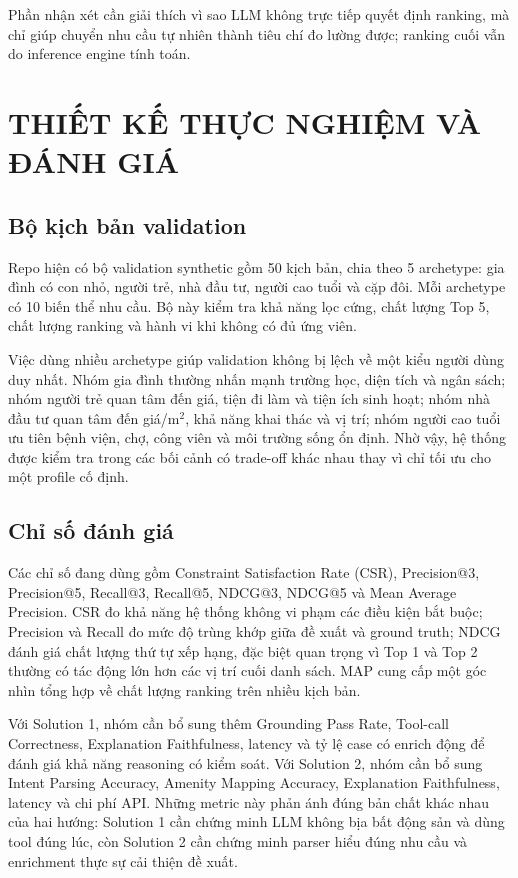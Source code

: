 \documentclass[a4paper,12pt]{article}
\begin{document}
Phần nhận xét cần giải thích vì sao LLM không trực tiếp quyết định ranking, mà chỉ giúp chuyển nhu cầu tự nhiên thành tiêu chí đo lường được; ranking cuối vẫn do inference engine tính toán.

\section{THIẾT KẾ THỰC NGHIỆM VÀ ĐÁNH GIÁ}

\subsection{Bộ kịch bản validation}
Repo hiện có bộ validation synthetic gồm 50 kịch bản, chia theo 5 archetype: gia đình có con nhỏ, người trẻ, nhà đầu tư, người cao tuổi và cặp đôi. Mỗi archetype có 10 biến thể nhu cầu. Bộ này kiểm tra khả năng lọc cứng, chất lượng Top 5, chất lượng ranking và hành vi khi không có đủ ứng viên.

Việc dùng nhiều archetype giúp validation không bị lệch về một kiểu người dùng duy nhất. Nhóm gia đình thường nhấn mạnh trường học, diện tích và ngân sách; nhóm người trẻ quan tâm đến giá, tiện đi làm và tiện ích sinh hoạt; nhóm nhà đầu tư quan tâm đến giá/m$^2$, khả năng khai thác và vị trí; nhóm người cao tuổi ưu tiên bệnh viện, chợ, công viên và môi trường sống ổn định. Nhờ vậy, hệ thống được kiểm tra trong các bối cảnh có trade-off khác nhau thay vì chỉ tối ưu cho một profile cố định.

\subsection{Chỉ số đánh giá}
Các chỉ số đang dùng gồm Constraint Satisfaction Rate (CSR), Precision@3, Precision@5, Recall@3, Recall@5, NDCG@3, NDCG@5 và Mean Average Precision. CSR đo khả năng hệ thống không vi phạm các điều kiện bắt buộc; Precision và Recall đo mức độ trùng khớp giữa đề xuất và ground truth; NDCG đánh giá chất lượng thứ tự xếp hạng, đặc biệt quan trọng vì Top 1 và Top 2 thường có tác động lớn hơn các vị trí cuối danh sách. MAP cung cấp một góc nhìn tổng hợp về chất lượng ranking trên nhiều kịch bản.

Với Solution 1, nhóm cần bổ sung thêm Grounding Pass Rate, Tool-call Correctness, Explanation Faithfulness, latency và tỷ lệ case có enrich động để đánh giá khả năng reasoning có kiểm soát. Với Solution 2, nhóm cần bổ sung Intent Parsing Accuracy, Amenity Mapping Accuracy, Explanation Faithfulness, latency và chi phí API. Những metric này phản ánh đúng bản chất khác nhau của hai hướng: Solution 1 cần chứng minh LLM không bịa bất động sản và dùng tool đúng lúc, còn Solution 2 cần chứng minh parser hiểu đúng nhu cầu và enrichment thực sự cải thiện đề xuất.
\end{document}
